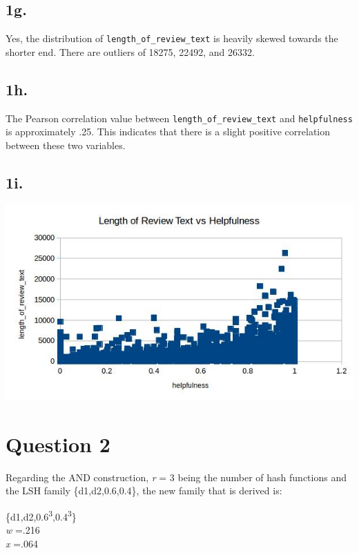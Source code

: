 \documentclass{article}
\begin{document}
\subsection{1g.}
Yes, the distribution of \texttt{length\_of\_review\_text}  is heavily skewed towards the shorter end. There are outliers of 18275, 22492, and 26332.

\subsection{1h.}
The Pearson correlation value between \texttt{length\_of\_review\_text} and \texttt{helpfulness} is approximately .25. This indicates that there is a slight positive correlation between these two variables.

\subsection{1i.}
\begin{center}
\includegraphics[keepaspectratio, scale=0.5]{scatter.jpg}
\end{center}

\section{Question 2}
Regarding the AND construction, \emph{r} = 3 being the number of hash functions and the LSH family \{d1,d2,0.6,0.4\}, the new family that is derived is:

\begin{center}
 \{d1,d2,0.6\textsuperscript{3},0.4\textsuperscript{3}\}\vspace{2mm}\\
\noindent\emph{w} =.216\\
\emph{x} =.064\\
\end{center}
\end{document}
